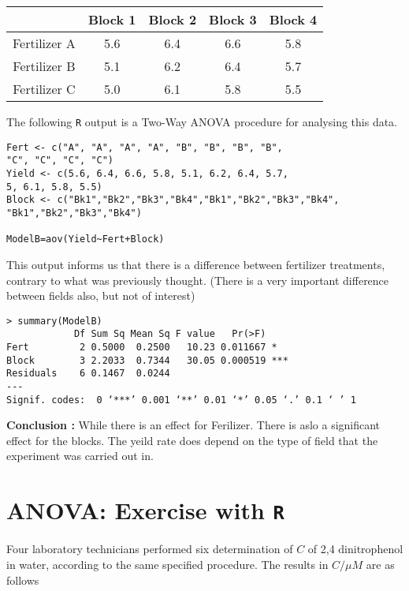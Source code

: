 \documentclass[12pt]{article}
\begin{document}
\begin{center}
\begin{tabular}{|c|c|c|c|c|}
\hline
 	&	Block 1	&	Block 2	&	Block 3	&	Block 4	\\ \hline
Fertilizer	A	&	5.6	&	6.4	&	6.6	&	5.8	\\ \hline
Fertilizer	B	&	5.1	&	6.2	&	6.4	&	5.7	\\ \hline
Fertilizer	C	&	5.0	&	6.1	&	5.8	&	5.5	\\ \hline
\end{tabular} 
\end{center}
The following \texttt{R} output is a Two-Way ANOVA procedure for analysing this data.

\begin{framed}
\begin{verbatim}
Fert <- c("A", "A", "A", "A", "B", "B", "B", "B", 
"C", "C", "C", "C")
Yield <- c(5.6, 6.4, 6.6, 5.8, 5.1, 6.2, 6.4, 5.7, 
5, 6.1, 5.8, 5.5)
Block <- c("Bk1","Bk2","Bk3","Bk4","Bk1","Bk2","Bk3","Bk4",
"Bk1","Bk2","Bk3","Bk4")

ModelB=aov(Yield~Fert+Block)
\end{verbatim}
\end{framed}


This output informs us that there is a difference between fertilizer treatments, contrary to what was previously thought. (There is a very important difference between fields also, but not of interest)
\begin{framed}
\begin{verbatim}
> summary(ModelB)
            Df Sum Sq Mean Sq F value   Pr(>F)    
Fert         2 0.5000  0.2500   10.23 0.011667 *  
Block        3 2.2033  0.7344   30.05 0.000519 ***
Residuals    6 0.1467  0.0244                     
---
Signif. codes:  0 ‘***’ 0.001 ‘**’ 0.01 ‘*’ 0.05 ‘.’ 0.1 ‘ ’ 1
\end{verbatim}
\end{framed}

\noindent \textbf{Conclusion :} While there is an effect for Ferilizer. There is aslo a significant effect for the blocks. The yeild rate does depend on the type of field that the experiment was carried out in.
\newpage

\section*{ANOVA: Exercise with \texttt{R}}
Four laboratory technicians performed six determination of $C$ of 2,4 dinitrophenol in water, according to the same specified procedure.
The results in $C/ \mu M$ are as follows
\end{document}
